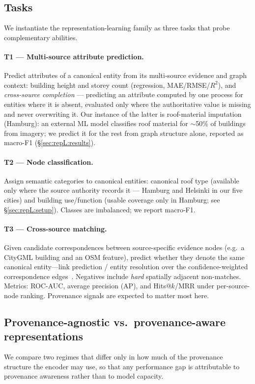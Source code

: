 \subsection{Tasks}
\label{sec:repL:tasks}
We instantiate the representation-learning family as three tasks that probe
complementary abilities.

\paragraph{T1 --- Multi-source attribute prediction.} Predict attributes of a
canonical entity from its multi-source evidence and graph context: building
height and storey count (regression, MAE/RMSE/$R^2$), and \emph{cross-source
completion} --- predicting an attribute computed by one process for entities
where it is absent, evaluated only where the authoritative value is missing
and never overwriting it. Our instance of the latter is roof-material
imputation (Hamburg): an external ML model classifies roof material for
$\sim$50\% of buildings from imagery; we predict it for the rest from graph
structure alone, reported as macro-F1 (\S\ref{sec:repL:results}).

\paragraph{T2 --- Node classification.} Assign semantic categories to canonical
entities: canonical roof type (available only where the source authority
records it --- Hamburg and Helsinki in our five cities) and building use/function
(usable coverage only in Hamburg; see \S\ref{sec:repL:setup}). Classes are
imbalanced; we report macro-F1.

\paragraph{T3 --- Cross-source matching.} Given candidate correspondences
between source-specific evidence nodes (e.g.\ a CityGML building and an OSM
feature), predict whether they denote the same canonical entity---link
prediction / entity resolution over the confidence-weighted correspondence
edges~\cite{wang2018gcnalign}. Negatives include \emph{hard} spatially adjacent
non-matches. Metrics: ROC-AUC, average precision (AP), and Hits@$k$/MRR under
per-source-node ranking. Provenance signals are expected to matter most here.

\subsection{Provenance-agnostic vs.\ provenance-aware representations}
\label{sec:repL:prov}
We compare two regimes that differ only in how much of the provenance structure
the encoder may use, so that any performance gap is attributable to provenance
awareness rather than to model capacity.

